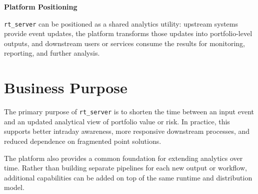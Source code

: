 \documentclass[10pt]{article}
\begin{document}
\hfill
\begin{minipage}[t]{0.37\textwidth}
	\vspace{0.5em}
	\begin{tcolorbox}[colback=lightgrey, colframe=brandblue!20, arc=4mm]
		{\large \textbf{\textcolor{brandblue}{Platform Positioning}}}

		\vspace{0.6em}

		\texttt{rt\_server} can be positioned as a shared analytics utility: upstream systems provide event updates, the platform transforms those updates into portfolio-level outputs, and downstream users or services consume the results for monitoring, reporting, and further analysis.
	\end{tcolorbox}
\end{minipage}

\vspace{1.8em}

\section*{\textcolor{brandblue}{Business Purpose}}

The primary purpose of \texttt{rt\_server} is to shorten the time between an input event and an updated analytical view of portfolio value or risk. In practice, this supports better intraday awareness, more responsive downstream processes, and reduced dependence on fragmented point solutions.

The platform also provides a common foundation for extending analytics over time. Rather than building separate pipelines for each new output or workflow, additional capabilities can be added on top of the same runtime and distribution model.

\vspace{1.6em}
\end{document}
